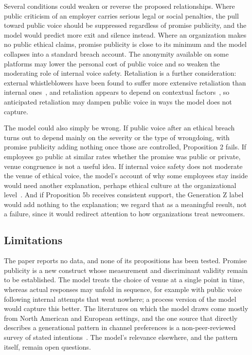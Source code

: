\documentclass[12pt,a4paper]{article}
\theoremstyle{definition}
\begin{document}
Several conditions could weaken or reverse the proposed relationships. Where public criticism of an employer carries serious legal or social penalties, the pull toward public voice should be suppressed regardless of promise publicity, and the model would predict more exit and silence instead. Where an organization makes no public ethical claims, promise publicity is close to its minimum and the model collapses into a standard breach account. The anonymity available on some platforms may lower the personal cost of public voice and so weaken the moderating role of internal voice safety. Retaliation is a further consideration: external whistleblowers have been found to suffer more extensive retaliation than internal ones~\citep{dworkin1998internal}, and retaliation appears to depend on contextual factors~\citep{mesmermagnus2005whistleblowing}, so anticipated retaliation may dampen public voice in ways the model does not capture.

The model could also simply be wrong. If public voice after an ethical breach turns out to depend mainly on the severity or the type of wrongdoing, with promise publicity adding nothing once those are controlled, Proposition 2 fails. If employees go public at similar rates whether the promise was public or private, venue congruence is not a useful idea. If internal voice safety does not moderate the venue of ethical voice, the model's account of why some employees stay inside would need another explanation, perhaps ethical culture at the organizational level~\citep{kaptein2011inaction}. And if Proposition 5b receives consistent support, the Generation Z label would add nothing to the explanation; we regard that as a meaningful result, not a failure, since it would redirect attention to how organizations treat newcomers.

\subsection{Limitations}

The paper reports no data, and none of its propositions has been tested. Promise publicity is a new construct whose measurement and discriminant validity remain to be established. The model treats the choice of venue at a single point in time, whereas actual responses may unfold in sequence, for example with public voice following internal attempts that went nowhere; a process version of the model would capture this better. The literatures on which the model draws come mostly from North American and European settings, and the one source that directly describes a generational pattern in channel preferences is a non-peer-reviewed survey of stated intentions~\citep{protect2025talkin}. The model's relevance elsewhere, and the pattern itself, remain open questions.
\end{document}
